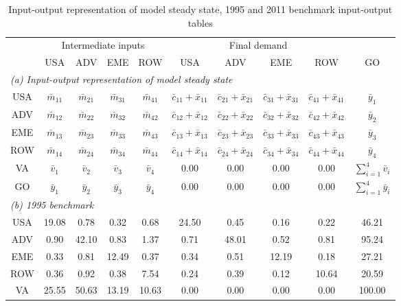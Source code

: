 \begin{table}[p]
\begin{center}
\caption{Input-output representation of model steady state, 1995 and 2011 benchmark input-output tables}
\label{tab:iomat-bench}
\small
\begin{tabular}{cccccccccc}
\toprule
& \multicolumn{4}{c}{Intermediate inputs}& \multicolumn{4}{c}{Final demand} & \\
\cmidrule(rl){2-5}\cmidrule(rl){6-9}
 &USA &ADV &EME &ROW &USA &ADV &EME &ROW& GO\\
\midrule
\multicolumn{10}{l}{\textit{(a) Input-output representation of model steady state}} \\
USA& $\bar{m}_{11}$  & $\bar{m}_{21}$  & $\bar{m}_{31}$ & $\bar{m}_{41}$ & $\bar{c}_{11}+\bar{x}_{11}$ & $\bar{c}_{21}+\bar{x}_{21}$ & $\bar{c}_{31}+\bar{x}_{31}$ & $\bar{c}_{41}+\bar{x}_{41}$ & $\bar{y}_1$ \\
ADV& $\bar{m}_{12}$  & $\bar{m}_{22}$  & $\bar{m}_{32}$ & $\bar{m}_{42}$ & $\bar{c}_{12}+\bar{x}_{12}$ & $\bar{c}_{22}+\bar{x}_{22}$ & $\bar{c}_{32}+\bar{x}_{32}$ & $\bar{c}_{42}+\bar{x}_{42}$ & $\bar{y}_2$ \\
EME& $\bar{m}_{13}$  & $\bar{m}_{23}$  & $\bar{m}_{33}$ & $\bar{m}_{43}$ & $\bar{c}_{13}+\bar{x}_{13}$ & $\bar{c}_{23}+\bar{x}_{23}$ & $\bar{c}_{33}+\bar{x}_{33}$ & $\bar{c}_{43}+\bar{x}_{43}$ & $\bar{y}_3$ \\
ROW& $\bar{m}_{14}$  & $\bar{m}_{24}$  & $\bar{m}_{34}$ & $\bar{m}_{44}$ & $\bar{c}_{14}+\bar{x}_{14}$ & $\bar{c}_{24}+\bar{x}_{24}$ & $\bar{c}_{34}+\bar{x}_{34}$ & $\bar{c}_{44}+\bar{x}_{44}$ & $\bar{y}_4$ \\
VA& $\bar{v}_1$ & $\bar{v}_2$ & $\bar{v}_3$ & $\bar{v}_4$ & 0.00& 0.00& 0.00& 0.00& $\sum_{i=1}^4 \bar{v}_i$ \\
GO& $\bar{y}_1$ & $\bar{y}_2$ & $\bar{y}_3$ & $\bar{y}_4$ & 0.00& 0.00& 0.00& 0.00& $\sum_{i=1}^4 \bar{y}_i$ \\
\midrule
\multicolumn{10}{l}{\textit{(b) 1995 benchmark}} \\
USA& 19.08& 0.78& 0.32& 0.68& 24.50& 0.45& 0.16& 0.22& 46.21 \\
ADV& 0.90& 42.10& 0.83& 1.37& 0.71& 48.01& 0.52& 0.81& 95.24 \\
EME& 0.33& 0.81& 12.49& 0.37& 0.34& 0.51& 12.19& 0.18& 27.21 \\
ROW& 0.36& 0.92& 0.38& 7.54& 0.24& 0.39& 0.12& 10.64& 20.59 \\
VA& 25.55& 50.63& 13.19& 10.63& 0.00& 0.00& 0.00& 0.00& 100.00\\

\end{tabular}
\end{center}
\end{table}
